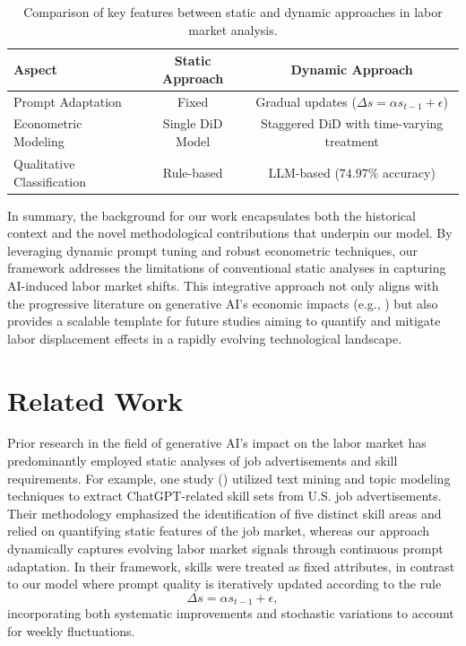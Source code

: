 \documentclass{article} %
\begin{document}
\begin{table}[h]
\centering
\begin{tabular}{lcc}
\hline
\textbf{Aspect} & \textbf{Static Approach} & \textbf{Dynamic Approach} \\
\hline
Prompt Adaptation & Fixed & Gradual updates (\(\Delta s = \alpha s_{t-1} + \epsilon\)) \\
Econometric Modeling & Single DiD Model & Staggered DiD with time-varying treatment \\
Qualitative Classification & Rule-based & LLM-based (\(74.97\%\) accuracy) \\
\hline
\end{tabular}
\caption{Comparison of key features between static and dynamic approaches in labor market analysis.}
\label{tab:comparison}
\end{table}

In summary, the background for our work encapsulates both the historical context and the novel methodological contributions that underpin our model. By leveraging dynamic prompt tuning and robust econometric techniques, our framework addresses the limitations of conventional static analyses in capturing AI-induced labor market shifts. This integrative approach not only aligns with the progressive literature on generative AI’s economic impacts (e.g., \cite{dominski2025advancingaicapabilitiesevolving}) but also provides a scalable template for future studies aiming to quantify and mitigate labor displacement effects in a rapidly evolving technological landscape.

\section{Related Work}
Prior research in the field of generative AI’s impact on the labor market has predominantly employed static analyses of job advertisements and skill requirements. For example, one study (\cite{ahmadi2024generativeaiimpactlabor}) utilized text mining and topic modeling techniques to extract ChatGPT-related skill sets from U.S. job advertisements. Their methodology emphasized the identification of five distinct skill areas and relied on quantifying static features of the job market, whereas our approach dynamically captures evolving labor market signals through continuous prompt adaptation. In their framework, skills were treated as fixed attributes, in contrast to our model where prompt quality is iteratively updated according to the rule 
\[
\Delta s = \alpha s_{t-1} + \epsilon,
\]
incorporating both systematic improvements and stochastic variations to account for weekly fluctuations.
\end{document}
